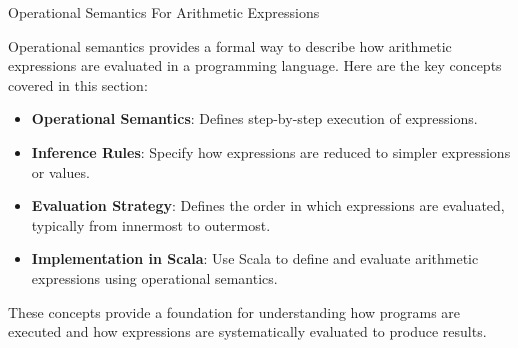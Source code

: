 \begin{notes}{Operational Semantics For Arithmetic Expressions}
\begin{highlight}
    \end{highlight}
    
    \begin{highlight}
    
        Operational semantics provides a formal way to describe how arithmetic expressions are evaluated in a programming language. Here are the key concepts covered in this section:
    
        \begin{itemize}
            \item \textbf{Operational Semantics}: Defines step-by-step execution of expressions.
            \item \textbf{Inference Rules}: Specify how expressions are reduced to simpler expressions or values.
            \item \textbf{Evaluation Strategy}: Defines the order in which expressions are evaluated, typically from innermost to outermost.
            \item \textbf{Implementation in Scala}: Use Scala to define and evaluate arithmetic expressions using operational semantics.
        \end{itemize}
        
        These concepts provide a foundation for understanding how programs are executed and how expressions are systematically evaluated to produce results.
    
    \end{highlight}
\end{notes}